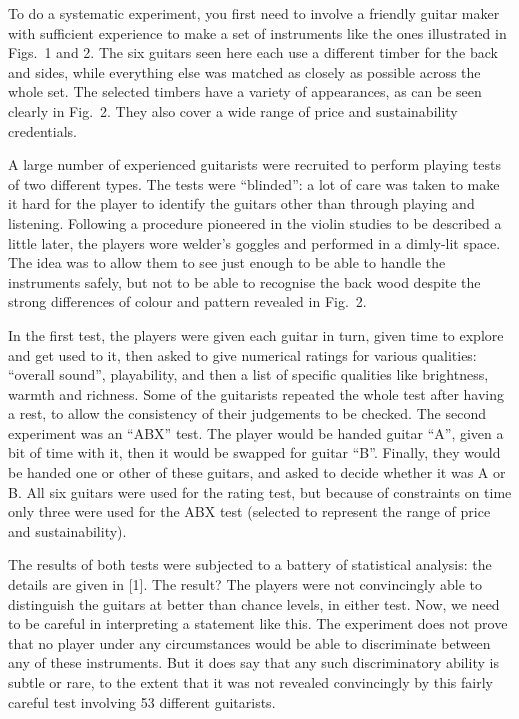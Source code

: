   To do a systematic experiment, you first need to involve a friendly guitar 
  maker with sufficient experience to make a set of instruments like the ones 
  illustrated in Figs.\ 1 and 2. The six guitars seen here each use a different 
  timber for the back and sides, while everything else was matched as closely 
  as possible across the whole set. The selected timbers have a variety of 
  appearances, as can be seen clearly in Fig.\ 2. They also cover a wide range 
  of price and sustainability credentials. 



  A large number of experienced guitarists were recruited to perform playing 
  tests of two different types. The tests were “blinded”: a lot of care was 
  taken to make it hard for the player to identify the guitars other than 
  through playing and listening. Following a procedure pioneered in the violin 
  studies to be described a little later, the players wore welder’s goggles and 
  performed in a dimly-lit space. The idea was to allow them to see just enough 
  to be able to handle the instruments safely, but not to be able to recognise 
  the back wood despite the strong differences of colour and pattern revealed 
  in Fig.\ 2. 

  In the first test, the players were given each guitar in turn, given time to 
  explore and get used to it, then asked to give numerical ratings for various 
  qualities: “overall sound”, playability, and then a list of specific 
  qualities like brightness, warmth and richness. Some of the guitarists 
  repeated the whole test after having a rest, to allow the consistency of 
  their judgements to be checked. The second experiment was an “ABX” test. The 
  player would be handed guitar “A”, given a bit of time with it, then it would 
  be swapped for guitar “B”. Finally, they would be handed one or other of 
  these guitars, and asked to decide whether it was A or B. All six guitars 
  were used for the rating test, but because of constraints on time only three 
  were used for the ABX test (selected to represent the range of price and 
  sustainability). 

  The results of both tests were subjected to a battery of statistical 
  analysis: the details are given in [1]. The result? The players were not 
  convincingly able to distinguish the guitars at better than chance levels, in 
  either test. Now, we need to be careful in interpreting a statement like 
  this. The experiment does not prove that no player under any circumstances 
  would be able to discriminate between any of these instruments. But it does 
  say that any such discriminatory ability is subtle or rare, to the extent 
  that it was not revealed convincingly by this fairly careful test involving 
  53 different guitarists. 


